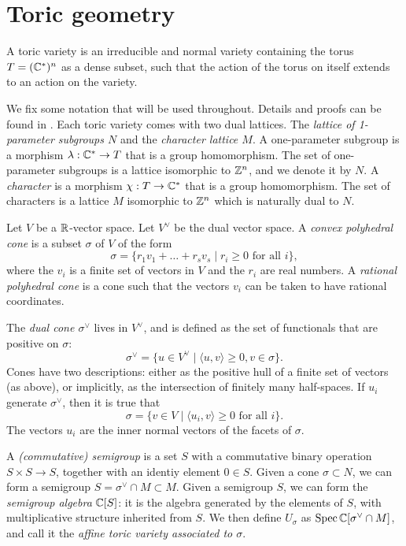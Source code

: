 
\section{Toric geometry} %
\label{sec:toric_geometry}

A toric variety is an irreducible and normal variety containing the torus $T=(\mathbb{C}^\ast)^n$  as a dense subset, such that the action of the torus on itself extends to an action on the variety.

We fix some notation that will be used throughout. Details and proofs can be found in \cite{cox_toric,fulton_toric}. Each toric variety comes with two dual lattices. The \emph{lattice of 1-parameter subgroups $N$} and the \emph{character lattice $M$}. A one-parameter subgroup is a morphism $\lambda:\mathbb{C} ^\ast \to T$ that is a group homomorphism. The set of one-parameter subgroups is a lattice isomorphic to $\mathbb{Z}^n$, and we denote it by $N$. A \emph{character} is a morphism $\chi:T \to \mathbb{C}^\ast$ that is a group homomorphism. The set of characters is a lattice $M$ isomorphic to $\mathbb{Z}^n$ which is naturally dual to $N$.

Let $V$ be a $\mathbb{R}$-vector space. Let $V^\vee$ be the dual vector space. A \emph{convex polyhedral cone} is a subset $\sigma$ of $V$ of the form
$$
\sigma = \{ r_1 v_1 + \ldots + r_s v_s \mid r_i \geq 0 \text{ for all } i \},
$$
where the $v_i$ is a finite set of vectors in $V$ and the $r_i$ are real numbers. A \emph{rational polyhedral cone} is a cone such that the vectors $v_i$ can be taken to have rational coordinates.

The \emph{dual cone $\sigma^\vee$} lives in $V^\vee$, and is defined as the set of functionals that are positive on $\sigma$:
$$
\sigma^\vee = \{ u \in V^\vee \mid \langle u,v\rangle \geq 0, v \in \sigma \}.
$$
Cones have two descriptions: either as the positive hull of a finite set of vectors (as above), or implicitly, as the intersection of finitely many half-spaces. If $u_i$ generate $\sigma^\vee$, then it is true that
$$
\sigma = \{ v \in V \mid \langle u_i,v \rangle \geq 0 \text{ for all } i \}.
$$
The vectors $u_i$ are the inner normal vectors of the facets of $\sigma$.

A \emph{(commutative) semigroup} is a set $S$ with a commutative binary operation $S \times S \to S$, together with an identiy element $0 \in S$. Given a cone $\sigma \subset N$, we can form a semigroup $S=\sigma^\vee \cap M \subset M$. Given a semigroup $S$, we can form the \emph{semigroup algebra} $\mathbb{C}[S]$: it is the algebra generated by the elements of $S$, with multiplicative structure inherited from $S$. We then define $U_\sigma$ as $\operatorname{Spec} \mathbb{C}[\sigma^\vee \cap M]$, and call it the \emph{affine toric variety associated to $\sigma$}. 

